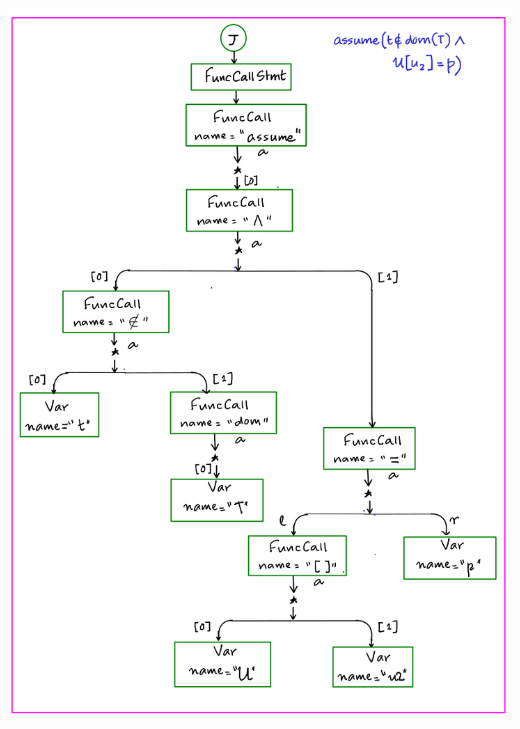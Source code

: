 \documentclass[12pts, a4paper]{article}
\begin{document}
\begin{center}
\includegraphics[width=\textwidth]{../images/ACT-AST-14.png}


\end{center}
\end{document}
